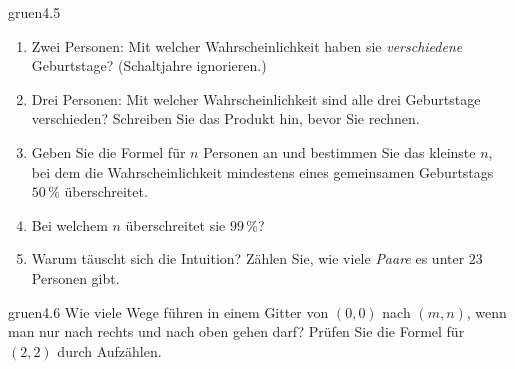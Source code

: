 \begin{karte}{gruen}{4.5}{\typwerk}{}
\begin{enumerate}[label=(\alph*),leftmargin=1.6em,itemsep=2pt]
\item Zwei Personen: Mit welcher Wahrscheinlichkeit haben sie \emph{verschiedene} Geburtstage? (Schaltjahre ignorieren.)
\item Drei Personen: Mit welcher Wahrscheinlichkeit sind alle drei Geburtstage verschieden? Schreiben Sie das Produkt hin, bevor Sie rechnen.
\item Geben Sie die Formel für $n$ Personen an und bestimmen Sie das kleinste $n$, bei dem die Wahrscheinlichkeit mindestens eines gemeinsamen Geburtstags $50\,\%$ überschreitet.
\item Bei welchem $n$ überschreitet sie $99\,\%$?
\item Warum täuscht sich die Intuition? Zählen Sie, wie viele \emph{Paare} es unter $23$ Personen gibt.
\end{enumerate}
\end{karte}

\begin{karte}{gruen}{4.6}{\typwerk}{}
Wie viele Wege führen in einem Gitter von $(0, 0)$ nach $(m, n)$, wenn man nur nach rechts und nach oben gehen darf? Prüfen Sie die Formel für $(2, 2)$ durch Aufzählen.
\end{karte}

